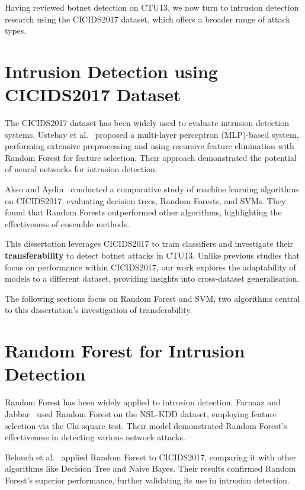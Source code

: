 Having reviewed botnet detection on CTU13, we now turn to intrusion detection research using the CICIDS2017 dataset, which offers a broader range of attack types.

\section{Intrusion Detection using CICIDS2017 Dataset}

The CICIDS2017 dataset has been widely used to evaluate intrusion detection systems. Ustebay et al.~\cite{ustebay2018intrusion} proposed a multi-layer perceptron (MLP)-based system, performing extensive preprocessing and using recursive feature elimination with Random Forest for feature selection. Their approach demonstrated the potential of neural networks for intrusion detection.

Aksu and Aydin~\cite{aksu2018detecting} conducted a comparative study of machine learning algorithms on CICIDS2017, evaluating decision trees, Random Forests, and SVMs. They found that Random Forests outperformed other algorithms, highlighting the effectiveness of ensemble methods.

This dissertation leverages CICIDS2017 to train classifiers and investigate their \textbf{transferability} to detect botnet attacks in CTU13. Unlike previous studies that focus on performance within CICIDS2017, our work explores the adaptability of models to a different dataset, providing insights into cross-dataset generalisation.

The following sections focus on Random Forest and SVM, two algorithms central to this dissertation’s investigation of transferability.

\section{Random Forest for Intrusion Detection}\label{sec:RandomForestIntrusion}

Random Forest has been widely applied to intrusion detection. Farnaaz and Jabbar~\cite{farnaaz2016random} used Random Forest on the NSL-KDD dataset, employing feature selection via the Chi-square test. Their model demonstrated Random Forest’s effectiveness in detecting various network attacks.

Belouch et al.~\cite{belouch2018performance} applied Random Forest to CICIDS2017, comparing it with other algorithms like Decision Tree and Naive Bayes. Their results confirmed Random Forest’s superior performance, further validating its use in intrusion detection.


